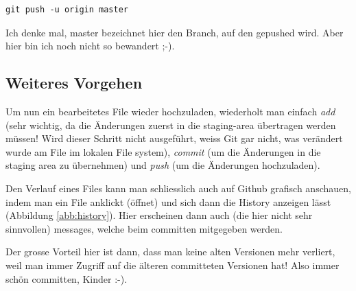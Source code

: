 \documentclass[twoside, 11pr]{article}
\begin{document}
\begin{lstlisting}
git push -u origin master
\end{lstlisting}

Ich denke mal, master bezeichnet hier den Branch, auf den gepushed wird. Aber hier bin ich noch nicht so bewandert ;-).

\subsection{Weiteres Vorgehen}

Um nun ein bearbeitetes File wieder hochzuladen, wiederholt man einfach \textit{add} (sehr wichtig, da die Änderungen zuerst in die staging-area übertragen werden müssen! Wird dieser Schritt nicht ausgeführt, weiss Git gar nicht, was verändert wurde am File im lokalen File system), \textit{commit} (um die Änderungen in die staging area zu übernehmen) und \textit{push} (um die Änderungen hochzuladen).\par
Den Verlauf eines Files kann man schliesslich auch auf Github grafisch anschauen, indem man ein File anklickt (öffnet) und sich dann die History anzeigen lässt (Abbildung \ref{abb:history}). Hier erscheinen dann auch (die hier nicht sehr sinnvollen) messages, welche beim committen mitgegeben werden.\par
Der grosse Vorteil hier ist dann, dass man keine alten Versionen mehr verliert, weil man immer Zugriff auf die älteren committeten Versionen hat! Also immer schön committen, Kinder :-).

\begin{figure}[!tbph]
\end{figure}
\end{document}
